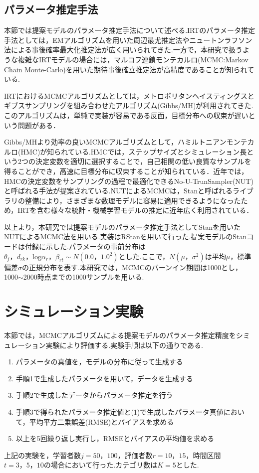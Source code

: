 \documentclass[a4paper,11pt,oneside,openany]{jsbook}
\begin{document}
\section{パラメータ推定手法}
本節では提案モデルのパラメータ推定手法について述べる.IRTのパラメータ推定手法としては，EMアルゴリズムを用いた周辺最尤推定法やニュートンラフソン法による事後確率最大化推定法が広く用いられてきた.一方で，本研究で扱うような複雑なIRTモデルの場合には，マルコフ連鎖モンテカルロ(MCMC:Markov Chain Monte-Carlo)を用いた期待事後確立推定法が高精度であることが知られている\cite{IRTUtoUeno,norm}.

IRTにおけるMCMCアルゴリズムとしては，メトロポリタンヘイスティングスとギブスサンプリングを組み合わせたアルゴリズム(Gibbs/MH)\cite{IRTUtoUeno,Patz,BiasUsami}が利用されてきた.このアルゴリズムは，単純で実装が容易である反面，目標分布への収束が遅いという問題がある\cite{Hoffman,Giroami}．

Gibbs/MHより効率の良いMCMCアルゴリズムとして，ハミルトニアンモンテカルロ(HMC)が知られている\cite{Rosenthal}.HMCでは，ステップサイズとシミュレーション長という2つの決定変数を適切に選択することで，自己相関の低い良質なサンプルを得ることができ，高速に目標分布に収束することが知られている\cite{Hoffman,Neal}．近年では，HMCの決定変数をサンプリングの過程で最適化できるNo-U-TrunSampler(NUT)\cite{Hoffman}と呼ばれる手法が提案されている.NUTによるMCMCは，Stan\cite{stan}と呼ばれるライブラリの整備により，さまざまな数理モデルに容易に適用できるようになったため，IRTを含む様々な統計・機械学習モデルの推定に近年広く利用されている\cite{Luo,Jiang,Matsura}．

以上より，本研究では提案モデルのパラメータ推定手法としてStanを用いたNUTによるMCMC法を用いる.実装はRStan\cite{rstan}を用いて行った.提案モデルのStanコードは付録に示した.パラメータの事前分布は$\theta_{j}，d_{rk}，\mathrm{log}\alpha_{r}，\beta_{rt}\sim N(0.0，1.0^{2})$とした.ここで，$N(\mu，\sigma^2)$は平均$\mu$，標準偏差$\sigma$の正規分布を表す.本研究では，MCMCのバーンイン期間は1000とし，1000$\sim$2000時点までの1000サンプルを用いる.
\newpage
\chapter{シミュレーション実験}

本節では，MCMCアルゴリズムによる提案モデルのパラメータ推定精度をシミュレーション実験により評価する.実験手順は以下の通りである.
\begin{enumerate}
\item パラメータの真値を，モデルの分布に従って生成する
\item 手順1で生成したパラメータを用いて，データを生成する
\item 手順2で生成したデータからパラメータ推定を行う
\item 手順3で得られたパラメータ推定値と(1)で生成したパラメータ真値において，平均平方二乗誤差(RMSE)とバイアスを求める
\item 以上を5回繰り返し実行し，RMSEとバイアスの平均値を求める
\end{enumerate}
上記の実験を，学習者数$j=50，100$，評価者数$r=10，15$，時間区間$t=3，5，10$の場合において行った.カテゴリ数は$K=5$とした.
\end{document}
